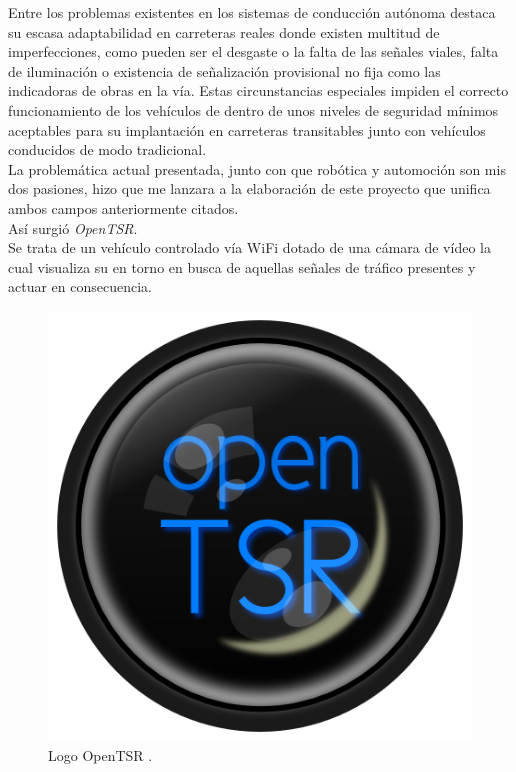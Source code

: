 \documentclass[a4paper,12pt]{article}
\begin{document}
Entre los problemas existentes en los sistemas de conducción autónoma destaca su escasa adaptabilidad en carreteras reales donde existen multitud de imperfecciones, como pueden ser el desgaste o la falta de las señales viales, falta de iluminación o existencia de señalización provisional no fija como las indicadoras de obras en la vía. Estas circunstancias especiales impiden el correcto funcionamiento de los vehículos de dentro de unos niveles de seguridad mínimos aceptables para su implantación en carreteras transitables junto con vehículos conducidos de modo tradicional.\\

La problemática actual presentada, junto con que robótica y automoción son mis dos pasiones, hizo que me lanzara a la elaboración de este proyecto que unifica ambos campos anteriormente citados.\\

Así surgió \emph{OpenTSR}.\\

Se trata de un vehículo controlado vía WiFi dotado de una cámara de vídeo la cual visualiza su en torno en busca de aquellas señales de tráfico presentes y actuar en consecuencia.\\

\begin{figure}[H]
  \begin{center}
    \includegraphics[scale=0.3]{imagenes/lente1.png}
  \end{center}
  \label{fig:logo}
 \caption{Logo OpenTSR \protect\footnotemark.}
\end{figure}
\end{document}
